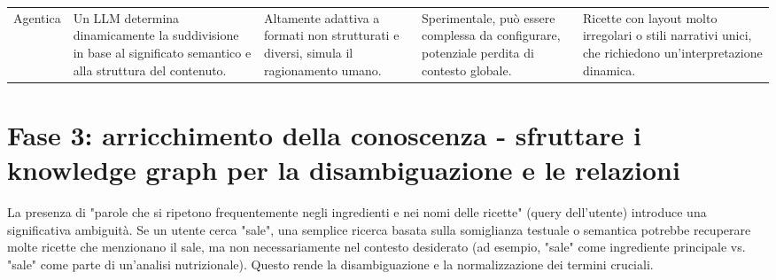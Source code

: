 \documentclass[a4paper, 11pt]{article}
\begin{document}
\begin{longtable}{>{\raggedright\arraybackslash}p{2.5cm} >{\raggedright\arraybackslash}p{3.5cm} >{\raggedright\arraybackslash}p{3.5cm} >{\raggedright\arraybackslash}p{3cm} >{\raggedright\arraybackslash}p{3.5cm}}
\addlinespace
Agentica \cite{chunking_strategies_ibm} & Un LLM determina dinamicamente la suddivisione in base al significato semantico e alla struttura del contenuto. & Altamente adattiva a formati non strutturati e diversi, simula il ragionamento umano. \cite{chunking_strategies_ibm} & Sperimentale, può essere complessa da configurare, potenziale perdita di contesto globale. \cite{f22_chunking_strategies} & Ricette con layout molto irregolari o stili narrativi unici, che richiedono un'interpretazione dinamica. \\
\end{longtable}

\section{Fase 3: arricchimento della conoscenza - sfruttare i knowledge graph per la disambiguazione e le relazioni}
La presenza di "parole che si ripetono frequentemente negli ingredienti e nei nomi delle ricette" (query dell'utente) introduce una significativa ambiguità. Se un utente cerca "sale", una semplice ricerca basata sulla somiglianza testuale o semantica potrebbe recuperare molte ricette che menzionano il sale, ma non necessariamente nel contesto desiderato (ad esempio, "sale" come ingrediente principale vs. "sale" come parte di un'analisi nutrizionale). Questo rende la disambiguazione e la normalizzazione dei termini cruciali.
\end{document}
